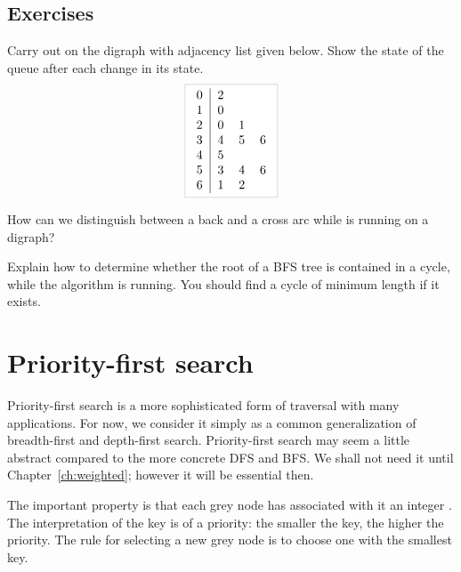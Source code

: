 \subsection*{Exercises}

\begin{Exercise}
\label{ex:doBFS}
Carry out  on the digraph with adjacency list given below. 
Show the state of the queue after each change in its state.
\newline
$$
\lightgraybox{
	\begin{tabular}{c|cccc}
		0 & 2 &   &   \\
		1 & 0 &   &   \\
		2 & 0 & 1 &   \\
		3 & 4 & 5 & 6 \\
		4 & 5 &   &   \\
		5 & 3 & 4 & 6 \\
		6 & 1 & 2 &   \\
	\end{tabular}
}
$$
\end{Exercise}


\begin{Exercise}
\label{ex:BFS-back-vs-cross}
How can we distinguish between a back and a cross arc while 
 is running on a digraph?

\end{Exercise}

\begin{Exercise}
\label{ex:BFS-cycle}
Explain how to determine whether the root of a BFS tree is contained in
a cycle, while the algorithm is running. You should find a cycle of
minimum length if it exists.
\end{Exercise}

\section{Priority-first search}
\label{sec:PFS}

Priority-first search is a more sophisticated form of traversal with
many applications. For now, we consider it simply as a common
generalization of breadth-first and depth-first search. Priority-first
search may seem a little abstract compared to the more concrete DFS and
BFS. We shall not need it until Chapter~\ref{ch:weighted}; however
it will be essential then.

The important property is that each grey node has associated with it an
integer . The interpretation of the key is of a priority: the
smaller the key, the higher the priority. The rule for selecting a new
grey node is to choose one with the smallest key.  

